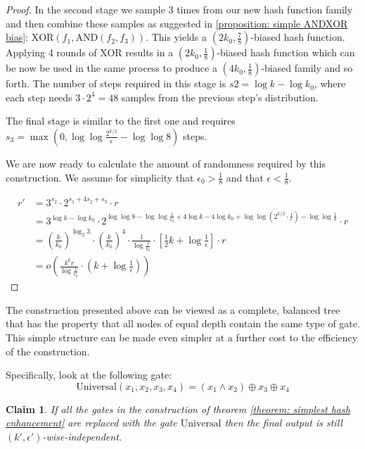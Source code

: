 \documentclass[12pt]{article}
\newtheorem{claim}[theorem]{Claim}
\newcommand{\AND}{\mathrm{AND} }
\newcommand{\XOR}{\mathrm{XOR} }
\begin{document}
\begin{proof}
		In the second stage we sample 3 times from our new hash function family and then combine these samples as suggested in \ref{proposition: simple ANDXOR bias}: $\XOR(f_1, \AND(f_2, f_3))$.
		This yields a $(2k_0, \frac{7}{8})$-biased hash function.
		Applying 4 rounds of XOR results in a $(2k_0, \frac{1}{8})$-biased hash function which can be now be used in the same process to produce a $(4k_0, \frac{1}{8})$-biased family and so forth.
		The number of steps required in this stage is $s2 = \log k - \log k_0$, where each step needs $3 \cdot 2^4 = 48$ samples from the previous step's distribution.
		
		The final stage is similar to the first one and requires $s_3 = \max(0, \log \log \frac{2^{k/2}}{\epsilon} - \log \log 8)$ steps.
		
		We are now ready to calculate the amount of randomness required by this construction.
		We assume for simplicity that $\epsilon_0 > \frac{1}{8}$ and that $\epsilon < \frac{1}{8}$.
		
		\begin{align*}
			r'
			&= 3^{s_2} \cdot 2^{s_1 + 4s_2 + s_3} \cdot r \\
			&= 3^{\log k - \log k_0}
				\cdot 2^{\log \log 8 - \log \log \frac{1}{\epsilon_0}
						+ 4\log k - 4\log k_0
						+ \log\log \left( 2^{k/2} \cdot \frac{1}{\epsilon} \right) - \log\log \frac{1}{8} } 
				\cdot r\\
			&= \left( \frac{k}{k_0} \right)^{\log_2 3} \cdot \left( \frac{k}{k_0} \right)^4
				\cdot \frac{1}{\log \frac{1}{\epsilon_0}} \cdot \left[ \frac{1}{2}k + \log \frac{1}{\epsilon} \right]
				\cdot r \\
			&= o\left( \frac{k^6 r}{\log \frac{1}{\epsilon_0}} \cdot \left(k + \log \frac{1}{\epsilon}\right) \right)
		\end{align*}
		
	\end{proof}
	
	The construction presented above can be viewed as a complete, balanced tree that has the property that all nodes of equal depth contain the same type of gate.
	This simple structure can be made even simpler at a further cost to the efficiency of the construction.
	
	Specifically, look at the following gate:
	\begin{equation*}
		\mathrm{Universal}(x_1, x_2, x_3, x_4) = (x_1 \wedge x_2) \oplus x_3 \oplus x_4
	\end{equation*}
	
	\begin{claim} \label{claim: universal gate}
		If all the gates in the construction of theorem \ref{theorem: simplest hash enhancement} are replaced with the gate $\mathrm{Universal}$ then the final output is still $(k', \epsilon')$-wise-independent.
	\end{claim}
	
\end{document}
